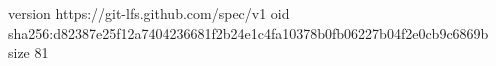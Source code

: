 version https://git-lfs.github.com/spec/v1
oid sha256:d82387e25f12a7404236681f2b24e1c4fa10378b0fb06227b04f2e0cb9c6869b
size 81
